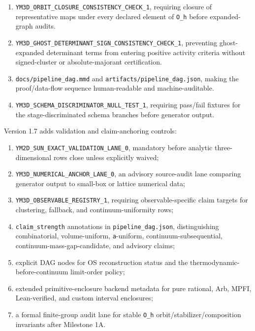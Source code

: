 \documentclass[
]{article}
\providecommand{\tightlist}{%
  \setlength{\itemsep}{0pt}\setlength{\parskip}{0pt}}
\begin{document}
\begin{enumerate}
\def\labelenumi{\arabic{enumi}.}
\tightlist
\item
  \texttt{YM3D\_ORBIT\_CLOSURE\_CONSISTENCY\_CHECK\_1}, requiring
  closure of representative maps under every declared element of
  \texttt{O\_h} before expanded-graph audits.
\item
  \texttt{YM3D\_GHOST\_DETERMINANT\_SIGN\_CONSISTENCY\_CHECK\_1},
  preventing ghost-expanded determinant terms from entering positive
  activity criteria without signed-cluster or absolute-majorant
  certification.
\item
  \texttt{docs/pipeline\_dag.mmd} and
  \texttt{artifacts/pipeline\_dag.json}, making the proof/data-flow
  sequence human-readable and machine-auditable.
\item
  \texttt{YM3D\_SCHEMA\_DISCRIMINATOR\_NULL\_TEST\_1}, requiring
  pass/fail fixtures for the stage-discriminated schema branches before
  generator output.
\end{enumerate}

Version 1.7 adds validation and claim-anchoring controls:

\begin{enumerate}
\def\labelenumi{\arabic{enumi}.}
\tightlist
\item
  \texttt{YM2D\_SUN\_EXACT\_VALIDATION\_LANE\_0}, mandatory before
  analytic three-dimensional rows close unless explicitly waived;
\item
  \texttt{YM3D\_NUMERICAL\_ANCHOR\_LANE\_0}, an advisory source-audit
  lane comparing generator output to small-box or lattice numerical
  data;
\item
  \texttt{YM3D\_OBSERVABLE\_REGISTRY\_1}, requiring observable-specific
  claim targets for clustering, fallback, and continuum-uniformity rows;
\item
  \texttt{claim\_strength} annotations in \texttt{pipeline\_dag.json},
  distinguishing combinatorial, volume-uniform, \texttt{a}-uniform,
  continuum-subsequential, continuum-mass-gap-candidate, and advisory
  claims;
\item
  explicit DAG nodes for OS reconstruction status and the
  thermodynamic-before-continuum limit-order policy;
\item
  extended primitive-enclosure backend metadata for pure rational, Arb,
  MPFI, Lean-verified, and custom interval enclosures;
\item
  a formal finite-group audit lane for stable \texttt{O\_h}
  orbit/stabilizer/composition invariants after Milestone 1A.
\end{enumerate}
\end{document}
